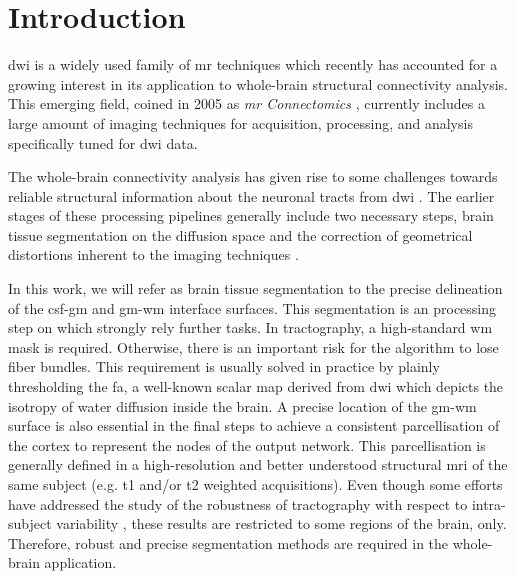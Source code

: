 \section{Introduction}
\label{sec:introduction}
%
\ac{dwi} is a widely used family of \ac{mr} techniques
\citep{sundgren_diffusion_2004} which recently has accounted for a growing
interest in its application to whole-brain structural connectivity analysis.
This emerging field, coined in 2005 as \emph{\ac{mr} Connectomics}
\citep{hagmann_diffusion_2005,sporns_human_2005}, currently includes a
large amount of imaging techniques for acquisition, processing, and analysis
specifically tuned for \ac{dwi} data.

The whole-brain connectivity analysis has given rise to some challenges
towards reliable structural information
about the neuronal tracts from \ac{dwi} \cite{johansen-berg_using_2009,
jones_white_2012}. The earlier stages of these
processing pipelines generally include two necessary steps, brain tissue
segmentation on the diffusion space and the correction of geometrical
distortions inherent to the imaging techniques \citep{hagmann_mr_2012}.

In this work, we will refer as brain tissue segmentation to the precise
delineation of the \ac{csf}-\ac{gm} and \ac{gm}-\ac{wm} interface surfaces.
This segmentation is an processing step on which strongly rely further
tasks. In tractography, a high-standard \ac{wm} mask is required. Otherwise,
there is an important risk for the algorithm to lose fiber bundles. This
requirement is usually solved in practice by plainly thresholding the 
\ac{fa}, a well-known scalar map derived from \ac{dwi} which depicts 
the isotropy of water diffusion inside the brain. 
A precise location of the
\ac{gm}-\ac{wm} surface is also essential in the final steps to
achieve a consistent parcellisation of the cortex to represent the nodes 
of the output network. This parcellisation is generally defined in a 
high-resolution and better understood structural \ac{mri} of the same 
subject (e.g. \ac{t1} and/or \ac{t2} weighted acquisitions). %
Even though some efforts have addressed
the study of the robustness of tractography with respect to intra-subject variability
\cite{wakana_reproducibility_2007,heiervang_between_2006}, these results are restricted to some regions of the brain, only. Therefore, robust
and precise segmentation methods are required in the whole-brain application. 

